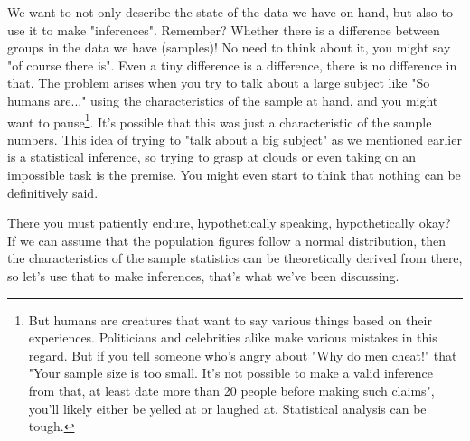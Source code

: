 \documentclass{ltjsbook}
\begin{document}
We want to not only describe the state of the data we have on hand, but also to use it to make "inferences". Remember? Whether there is a difference between groups in the data we have (samples)! No need to think about it, you might say "of course there is". Even a tiny difference is a difference, there is no difference in that. The problem arises when you try to talk about a large subject like "So humans are..." using the characteristics of the sample at hand, and you might want to pause\footnote{But humans are creatures that want to say various things based on their experiences. Politicians and celebrities alike make various mistakes in this regard. But if you tell someone who's angry about "Why do men cheat!" that "Your sample size is too small. It's not possible to make a valid inference from that, at least date more than 20 people before making such claims", you'll likely either be yelled at or laughed at. Statistical analysis can be tough.}. It's possible that this was just a characteristic of the sample numbers. This idea of trying to "talk about a big subject" as we mentioned earlier is a statistical inference, so trying to grasp at clouds or even taking on an impossible task is the premise. You might even start to think that nothing can be definitively said.

There you must patiently endure, hypothetically speaking, hypothetically okay? If we can assume that the population figures follow a normal distribution, then the characteristics of the sample statistics can be theoretically derived from there, so let's use that to make inferences, that's what we've been discussing.
\end{document}

